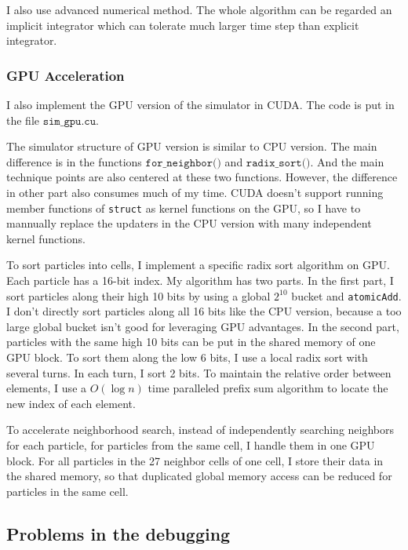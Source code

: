 \documentclass[acmlarge]{acmart}
\begin{document}
I also use advanced numerical method. The whole algorithm can be regarded an implicit integrator which can tolerate
much larger time step than explicit integrator.
\subsubsection{GPU Acceleration}
I also implement the GPU version of the simulator in CUDA. The code is put in the file $\texttt{sim\_gpu.cu}$.

The simulator structure of GPU version is similar to CPU version. The main difference is 
in the functions $\texttt{for\_neighbor()}$ and $\texttt{radix\_sort()}$. 
And the main technique points are also centered at these two functions.
However, the difference in other part
also consumes much of my time. CUDA doesn't support running member functions of \texttt{struct} as kernel functions on the GPU,
so I have to mannually replace the updaters in the CPU version with many independent kernel functions.

To sort particles into cells, I implement a specific radix sort algorithm on GPU.
Each particle has a 16-bit index. My algorithm has two parts.
In the first part, I sort particles along their high 10 bits by using a global $2^{10}$ bucket and 
\texttt{atomicAdd}. I don't directly sort particles along all 16 bits like the CPU version, because a too large 
global bucket isn't good for leveraging GPU advantages. In the second part, particles with the same high 10 bits can be 
put in the shared memory of one GPU block. To sort them along the low 6 bits,
I use a local radix sort with several turns. In each turn, I sort 2 bits. 
To maintain the relative order between elements, I use a $O(\log{n})$ time paralleled prefix sum algorithm to locate the new index of each element.

To accelerate neighborhood search, instead of independently searching neighbors for each particle, for particles from the same cell, 
I handle them in one GPU block. For all particles in the 27 neighbor cells of one cell, I store their data in the shared memory, 
so that duplicated global memory access can be reduced for particles in the same cell.

\subsection{Problems in the debugging}
\end{document}
